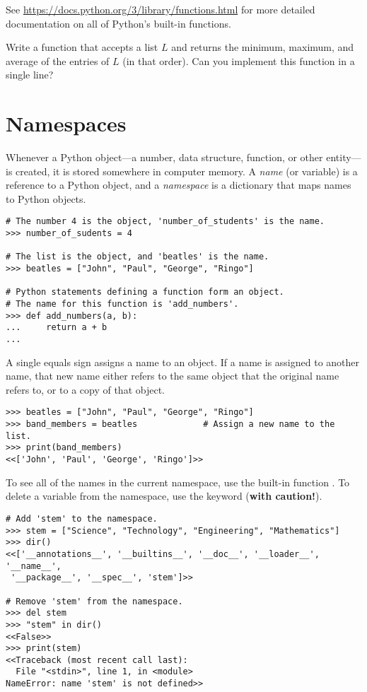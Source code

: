 See \url{https://docs.python.org/3/library/functions.html} for more detailed documentation on all of Python's built-in functions.

\begin{problem} %
Write a function that accepts a list $L$ and returns the minimum, maximum, and average of the entries of $L$ (in that order).
Can you implement this function in a single line?
\end{problem}

\section*{Namespaces} %

Whenever a Python object---a number, data structure, function, or other entity---is created, it is stored somewhere in computer memory.
A \emph{name} (or variable) is a reference to a Python object, and a \emph{namespace} is a dictionary that maps names to Python objects.

\begin{lstlisting}
# The number 4 is the object, 'number_of_students' is the name.
>>> number_of_sudents = 4

# The list is the object, and 'beatles' is the name.
>>> beatles = ["John", "Paul", "George", "Ringo"]

# Python statements defining a function form an object.
# The name for this function is 'add_numbers'.
>>> def add_numbers(a, b):
...     return a + b
...
\end{lstlisting}

A single equals sign assigns a name to an object.
If a name is assigned to another name, that new name either refers to the same object that the original name refers to, or to a copy of that object.

\begin{lstlisting}
>>> beatles = ["John", "Paul", "George", "Ringo"]
>>> band_members = beatles             # Assign a new name to the list.
>>> print(band_members)
<<['John', 'Paul', 'George', 'Ringo']>>
\end{lstlisting}

To see all of the names in the current namespace, use the built-in function .
To delete a variable from the namespace, use the  keyword (\textbf{with caution!}).

\begin{lstlisting}
# Add 'stem' to the namespace.
>>> stem = ["Science", "Technology", "Engineering", "Mathematics"]
>>> dir()
<<['__annotations__', '__builtins__', '__doc__', '__loader__', '__name__',
 '__package__', '__spec__', 'stem']>>

# Remove 'stem' from the namespace.
>>> del stem
>>> "stem" in dir()
<<False>>
>>> print(stem)
<<Traceback (most recent call last):
  File "<stdin>", line 1, in <module>
NameError: name 'stem' is not defined>>
\end{lstlisting}

